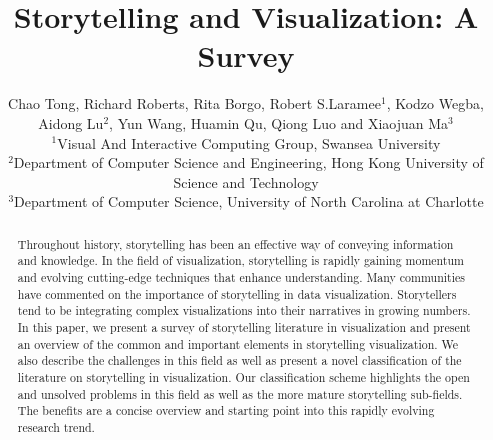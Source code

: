 \documentclass{egpubl}
\begin{document}
\title[Storytelling and Visualization: A Survey]%
      {Storytelling and Visualization: A Survey}

\author[C.Tong \& R. Roberts \& R.Borgo\&R.S.Laramee]
       {Chao Tong, Richard Roberts, Rita Borgo, Robert S.Laramee$^{1}$,
        Kodzo Wegba, Aidong Lu$^{2}$,
        Yun Wang, Huamin Qu, Qiong Luo and Xiaojuan Ma$^{3}$
        \\
         $^1$Visual And Interactive Computing Group, Swansea University\\
         $^2$Department of Computer Science and Engineering, Hong Kong University of Science and Technology\\
         $^3$Department of Computer Science, University of North Carolina at Charlotte\\
       }
\maketitle
\begin{abstract}
Throughout history, storytelling has been an effective way of conveying information and knowledge. In the field of visualization, storytelling is rapidly gaining momentum and evolving cutting-edge techniques that enhance understanding. Many communities have commented on the importance of storytelling in data visualization. Storytellers tend to be integrating complex visualizations into their narratives in growing numbers. In this paper, we present a survey of storytelling literature in visualization and present an overview of the common and important elements in storytelling visualization. We also describe the challenges in this field as well as present a novel classification of the literature on storytelling in visualization. Our classification scheme highlights the open and unsolved problems in this field as well as the more mature storytelling sub-fields. The benefits are a concise overview and starting point into this rapidly evolving research trend.
\end{abstract}
\end{document}
